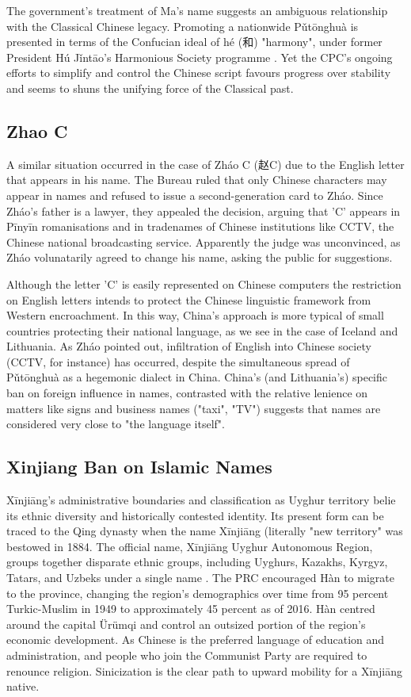 The government's treatment of Ma's name suggests an ambiguous relationship with
the Classical Chinese legacy. Promoting a nationwide Pǔtōnghuà is presented in
terms of the Confucian ideal of hé ({\zafont 和}) "harmony", under former
President Hú Jǐntāo's Harmonious Society programme \parencite{wang16}. Yet the
CPC's ongoing efforts to simplify and control the Chinese script favours
progress over stability and seems to shuns the unifying force of the Classical
past.

\subsection{Zhao C}

A similar situation occurred in the case of Zháo C ({\zafont 赵}C) due to the
English letter that appears in his name. The Bureau ruled that only Chinese
characters may appear in names and refused to issue a second-generation card to
Zháo. Since Zháo's father is a lawyer, they appealed the decision, arguing that
'C' appears in Pīnyīn romanisations and in tradenames of Chinese institutions
like CCTV, the Chinese national broadcasting service. Apparently the judge was
unconvinced, as Zháo volunatarily agreed to change his name, asking the public
for suggestions. \parencite{martinsen09}

Although the letter 'C' is easily represented on Chinese computers the
restriction on English letters intends to protect the Chinese linguistic
framework from Western encroachment. In this way, China's approach is more
typical of small countries protecting their national language, as we see in the
case of Iceland and Lithuania. As Zháo pointed out, infiltration of English into
Chinese society (CCTV, for instance) has occurred, despite the simultaneous
spread of Pǔtōnghuà as a hegemonic dialect in China. China's (and Lithuania's)
specific ban on foreign influence in names, contrasted with the relative
lenience on matters like signs and business names ("taxi", "TV") suggests that
names are considered very close to "the language itself".

\subsection{Xinjiang Ban on Islamic Names}

Xīnjiāng's administrative boundaries and classification as Uyghur territory
belie its ethnic diversity and historically contested identity. Its present form
can be traced to the Qing dynasty when the name Xīnjiāng (literally "new
territory" was bestowed in 1884. The official name, Xīnjiāng Uyghur Autonomous
Region, groups together disparate ethnic groups, including Uyghurs, Kazakhs,
Kyrgyz, Tatars, and Uzbeks under a single name \parencite{ang16}. The PRC
encouraged Hàn to migrate to the province, changing the region's demographics
over time from 95 percent Turkic-Muslim in 1949 to approximately 45 percent as
of 2016. Hàn centred around the capital Ürümqi and control an outsized portion
of the region's economic development. As Chinese is the preferred language of
education and administration, and people who join the Communist Party are
required to renounce religion. Sinicization is the clear path to upward mobility
for a Xīnjiāng native.

